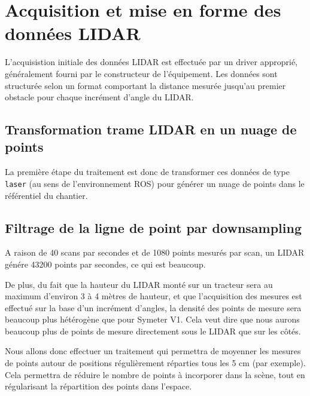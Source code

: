 \documentclass[12pt,a4paper]{report}
\begin{document}
	
	\section{Acquisition et mise en forme des données LIDAR}
	L'acquisistion initiale des données LIDAR est effectuée par un driver approprié, généralement fourni par le constructeur de l'équipement. Les données sont structurée selon un format comportant la distance mesurée jusqu'au premier obstacle pour chaque incrément d'angle du LIDAR.

	
		\subsection{Transformation trame LIDAR en un nuage de points}
	
		\para La première étape du traitement est donc de transformer ces données de type \verb|laser| (au sens de l'environnement ROS) pour générer un nuage de points dans le référentiel du chantier.
	
	
		\subsection{Filtrage de la ligne de point par downsampling}
	
		\para A raison de 40 scans par secondes et de 1080 points mesurés par scan, un LIDAR génére 43200 points par secondes, ce qui est beaucoup.
	
		\para De plus, du fait que la hauteur du LIDAR monté sur un tracteur sera au maximum d'environ 3 à 4 mètres de hauteur, et que l'acquisition des mesures est effectué sur la base d'un incrément d'angles, la densité des points de mesure sera beaucoup plus hétérogène que pour Symeter V1. Cela veut dire que nous aurons beaucoup plus de points de mesure directement sous le LIDAR que sur les côtés.
	
		\para Nous allons donc effectuer un traitement qui permettra de moyenner les mesures de points autour de positions régulièrement réparties tous les 5 cm (par exemple). Cela permettra de réduire le nombre de points à incorporer dans la scène,  tout en régularisant la répartition des points dans l'espace.
		
\end{document}

